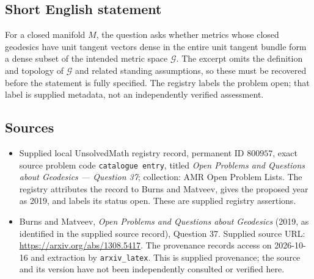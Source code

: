 \documentclass[11pt]{article}
\begin{document}
\subsection{Short English statement}
For a closed manifold \(M\), the question asks whether metrics whose closed geodesics have unit tangent vectors dense in the entire unit tangent bundle form a dense subset of the intended metric space \(\mathcal G\). The excerpt omits the definition and topology of \(\mathcal G\) and related standing assumptions, so these must be recovered before the statement is fully specified. The registry labels the problem open; that label is supplied metadata, not an independently verified assessment.
\subsection{Sources}
\begin{itemize}
\item Supplied local UnsolvedMath registry record, permanent ID \(800957\), exact source problem code \texttt{catalogue entry}, titled \emph{Open Problems and Questions about Geodesics --- Question 37}; collection: AMR Open Problem Lists. The registry attributes the record to Burns and Matveev, gives the proposed year as 2019, and labels its status open. These are supplied registry assertions.
\item Burns and Matveev, \emph{Open Problems and Questions about Geodesics} (2019, as identified in the supplied source record), Question 37. Supplied source URL: \url{https://arxiv.org/abs/1308.5417}. The provenance records access on 2026-10-16 and extraction by \texttt{arxiv\_latex}. This is supplied provenance; the source and its version have not been independently consulted or verified here.
\end{itemize}
\end{document}
